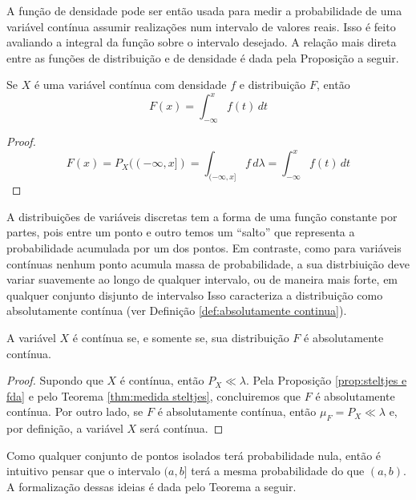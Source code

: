 A função de densidade pode ser então usada para medir a probabilidade de uma variável
contínua assumir realizações num intervalo de valores reais.
Isso é feito avaliando a integral da função sobre o intervalo desejado.
A relação mais direta entre as funções de distribuição e de densidade é dada pela
Proposição a seguir.

\begin{prop:fdp e fda}
\label{prop:fdp e fda}
Se $X$ é uma variável contínua com densidade $f$ e distribuição $F$, então
\[
	F(x) = \int_{-\infty}^x f(t)\,dt
\]
\begin{proof}
	\[
		F(x) = P_X((-\infty, x]) = \int_{(-\infty, x]} f\, d\lambda = \int_{-\infty}^x f(t)\, dt
	\]
\end{proof}
\end{prop:fdp e fda}

A distribuições de variáveis discretas tem a forma de uma função constante por partes,
pois entre um ponto e outro temos um ``salto'' que representa a probabilidade acumulada
por um dos pontos.
Em contraste, como para variáveis contínuas nenhum ponto acumula massa de probabilidade,
a sua distrbiuição deve variar suavemente ao longo de qualquer intervalo, ou de maneira mais
forte, em qualquer conjunto disjunto de intervalso
Isso caracteriza a distribuição como absolutamente contínua (ver Definição
\ref{def:absolutamente continua}).

\begin{prop:continuidade fda}
A variável $X$ é contínua se, e somente se, sua distribuição $F$ é absolutamente contínua.
\end{prop:continuidade fda}
\begin{proof}
	Supondo que $X$ é contínua, então $P_X \ll \lambda$.
	Pela Proposição \ref{prop:steltjes e fda} e pelo Teorema \ref{thm:medida steltjes},
	concluiremos que $F$ é absolutamente contínua.
	Por outro lado, se $F$ é absolutamente contínua, então $\mu_F = P_X \ll \lambda$ e,
	por definição, a variável $X$ será contínua.
\end{proof}

Como qualquer conjunto de pontos isolados terá probabilidade nula, então é intuitivo
pensar que o intervalo $(a, b]$ terá a mesma probabilidade do que $(a, b)$.
A formalização dessas ideias é dada pelo Teorema a seguir.

